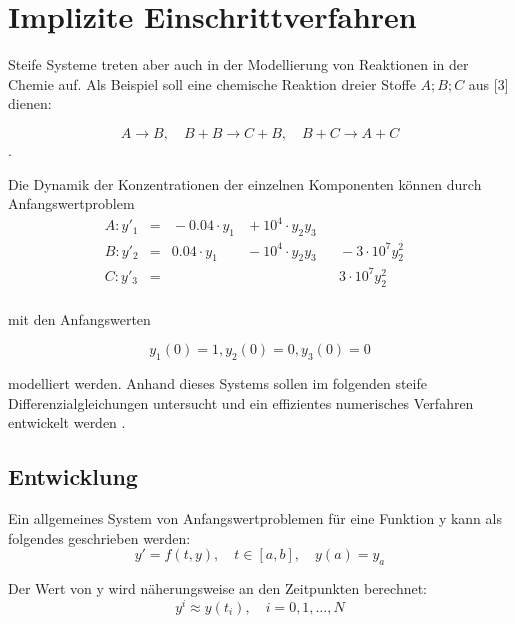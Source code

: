 \chapter{Implizite Einschrittverfahren}

Steife Systeme treten aber auch in der Modellierung von Reaktionen in der Chemie auf. Als Beispiel soll
eine chemische Reaktion dreier Stoffe $A;B;C$ aus [3] dienen:

\begin{equation*}
	A \rightarrow B, \quad B + B \rightarrow C+ B, \quad B + C \rightarrow A + C
\end{equation*}. 

Die Dynamik der Konzentrationen der einzelnen Komponenten können durch Anfangswertproblem
\begin{align}\label{eq:matrix}
	A:y'_1&= &{}-0.04\cdot y_1  &{}+ 10^4\cdot y_2y_3& & &\\
	B:y'_2&= & 0.04\cdot y_1  &{}- 10^4\cdot y_2y_3& &{}- 3\cdot 10^7y_2^2 &\\
	C:y'_3&= &                  &                  &  & 3\cdot 10^7y_2^2 &\\
\end{align}


mit den Anfangswerten

\begin{equation*}
y_1(0) = 1, y_2(0) = 0, y_3(0) = 0
\end{equation*}  

modelliert werden. Anhand dieses Systems sollen im folgenden steife Differenzialgleichungen untersucht
und ein effizientes numerisches Verfahren entwickelt werden \cite{Prof.Dr.AndreasZeiser.April2021}.

\section{Entwicklung}

Ein allgemeines System von Anfangswertproblemen für eine Funktion y kann als folgendes geschrieben werden:
\begin{equation}
	 y' = f(t,y) ,\quad t \in [a,b],\quad y(a) = y_a 
\end{equation}



Der Wert von y wird näherungsweise an den Zeitpunkten berechnet:
\begin{equation}
	 y^i \approx y(t_i),\quad i = 0,1,\dots,N 
\end{equation}


